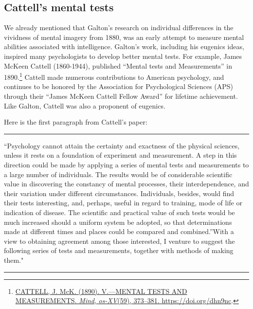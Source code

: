 \documentclass[
  oneside,
  12pt]{crumpbook}
\begin{document}
\hypertarget{cattells-mental-tests}{%
\subsection{Cattell's mental tests}\label{cattells-mental-tests}}

We already mentioned that Galton's research on individual differences in the vividness of mental imagery from 1880, was an early attempt to measure mental abilities associated with intelligence. Galton's work, including his eugenics ideas, inspired many psychologists to develop better mental tests. For example, James McKeen Cattell (1860-1944), published ``Mental tests and Measurements'' in 1890.\footnote{\protect\hyperlink{ref-cattellMENTALTESTSMEASUREMENTS1890}{CATTELL, J. McK. (1890). V.---{MENTAL TESTS AND MEASUREMENTS}. \emph{Mind}, \emph{os-XV}(59), 373--381. \url{https://doi.org/dhn9nc}}.} Cattell made numerous contributions to American psychology, and continues to be honored by the Association for Psychological Sciences (APS) through their ``James McKeen Cattell Fellow Award'' for lifetime achievement. Like Galton, Cattell was also a proponent of eugenics.

Here is the first paragraph from Cattell's paper:

\begin{center}\rule{0.5\linewidth}{0.5pt}\end{center}

``Psychology cannot attain the certainty and exactness of the physical sciences, unless it rests on a foundation of experiment and measurement. A step in this direction could be made by applying a series of mental tests and measurements to a large number of individuals. The results would be of considerable scientific value in discovering the constancy of mental processes, their interdependence, and their variation under different circumstances. Individuals, besides, would find their tests interesting, and, perhaps, useful in regard to training, mode of life or indication of disease. The scientific and practical value of such tests would be much increased should a uniform system be adopted, so that determinations made at different times and places could be compared and combined.''With a view to obtaining agreement among those interested, I venture to suggest the following series of tests and measurements, together with methods of making them."

\begin{center}\rule{0.5\linewidth}{0.5pt}\end{center}
\end{document}
